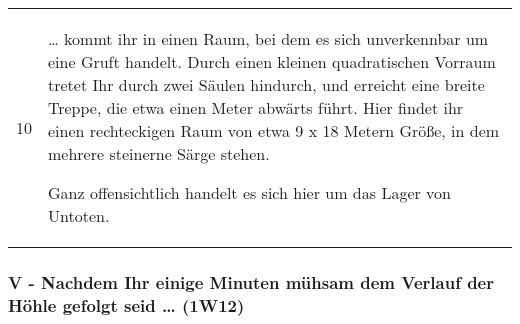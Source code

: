 \documentclass[11pt]{wbzine}
\begin{document}
\begin{tabularx}{\columnwidth}{cZ}
10 & 
  \ldots{} kommt ihr in einen Raum, bei dem es sich unverkennbar um eine
  Gruft handelt. Durch einen kleinen quadratischen Vorraum tretet Ihr
  durch zwei Säulen hindurch, und erreicht eine breite Treppe, die etwa
  einen Meter abwärts führt. Hier findet ihr einen rechteckigen Raum von
  etwa 9 x 18 Metern Größe, in dem mehrere steinerne Särge stehen.

  Ganz offensichtlich handelt es sich hier um das Lager von Untoten.
\end{tabularx}

\subsubsection{V - Nachdem Ihr einige Minuten mühsam dem Verlauf der Höhle
gefolgt seid \ldots{} (1W12)}
\end{document}
